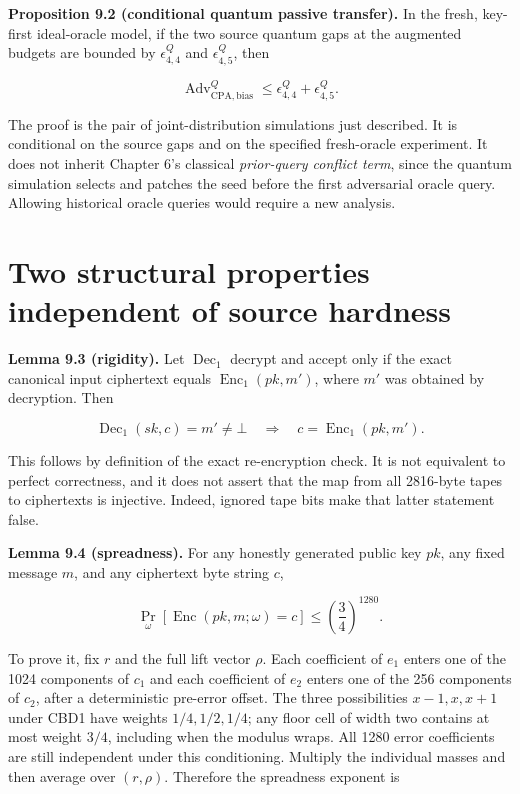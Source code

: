 \documentclass[
  11pt,
  a4paper,
  oneside]{report}
\begin{document}
\textbf{Proposition 9.2 (conditional quantum passive transfer).} In the
fresh, key-first ideal-oracle model, if the two source quantum gaps at
the augmented budgets are bounded by \(\epsilon_{4,4}^{Q}\) and
\(\epsilon_{4,5}^{Q}\), then

\[
\operatorname{Adv}^{Q}_{\mathrm{CPA,bias}}\le
\epsilon_{4,4}^{Q}+\epsilon_{4,5}^{Q}.
\]

The proof is the pair of joint-distribution simulations just described.
It is conditional on the source gaps and on the specified fresh-oracle
experiment. It does not inherit Chapter 6's classical \emph{prior-query
conflict term}, since the quantum simulation selects and patches the
seed before the first adversarial oracle query. Allowing historical
oracle queries would require a new analysis.

\section{Two structural properties independent of source
hardness}\label{two-structural-properties-independent-of-source-hardness}

\textbf{Lemma 9.3 (rigidity).} Let \(\operatorname{Dec}_1\) decrypt and
accept only if the exact canonical input ciphertext equals
\(\operatorname{Enc}_1(pk,m')\), where \(m'\) was obtained by
decryption. Then

\[
\operatorname{Dec}_1(sk,c)=m'\neq\bot
\quad\Longrightarrow\quad
c=\operatorname{Enc}_1(pk,m').
\]

This follows by definition of the exact re-encryption check. It is not
equivalent to perfect correctness, and it does not assert that the map
from all 2816-byte tapes to ciphertexts is injective. Indeed, ignored
tape bits make that latter statement false.

\textbf{Lemma 9.4 (spreadness).} For any honestly generated public key
\(pk\), any fixed message \(m\), and any ciphertext byte string \(c\),

\[
\Pr_{\omega}[\operatorname{Enc}(pk,m;\omega)=c]
\le\left(\frac34\right)^{1280}.
\]

To prove it, fix \(r\) and the full lift vector \(\rho\). Each
coefficient of \(e_1\) enters one of the 1024 components of \(c_1\) and
each coefficient of \(e_2\) enters one of the 256 components of \(c_2\),
after a deterministic pre-error offset. The three possibilities
\(x-1,x,x+1\) under CBD1 have weights \(1/4,1/2,1/4\); any floor cell of
width two contains at most weight \(3/4\), including when the modulus
wraps. All 1280 error coefficients are still independent under this
conditioning. Multiply the individual masses and then average over
\((r,\rho)\). Therefore the spreadness exponent is
\end{document}
